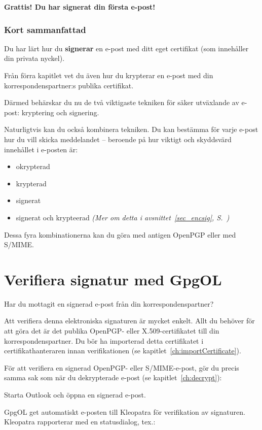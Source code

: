 \documentclass[a4paper,11pt, oneside,openright,titlepage,dvips]{scrbook}
\newcounter{part}
\newcounter{chapter}
\newcounter{section}[chapter]
\begin{document}
\textbf{Grattis! Du har signerat din första e-post!}


\clearpage
\subsubsection{Kort sammanfattad}
Du har lärt hur du \textbf{signerar} en e-post med ditt eget certifikat
(som innehåller din privata nyckel).

Från förra kapitlet vet du även hur du krypterar en e-post
med din korrespondenspartner:s publika certifikat.

Därmed behärskar du nu de två viktigaste tekniken för säker
utväxlande av e-post: kryptering och signering.

Naturligtvis kan du också kombinera tekniken. Du kan bestämma för
varje e-post hur du vill skicka meddelandet -- beroende på hur
viktigt och skyddsvärd innehållet i e-posten är:

\begin{itemize}
    \item okrypterad
    \item krypterad
    \item signerat
    \item signerat och krypteerad \textit{(Mer om detta i
        avsnittet~\ref{sec_encsig}, S.~\pageref{sec_encsig})}
\end{itemize}

Dessa fyra kombinationerna kan du göra med antigen OpenPGP eller
med S/MIME.


\clearpage
\section{Verifiera signatur med GpgOL}
Har du mottagit en signerad e-post från din
korrespondenspartner?

Att verifiera denna elektroniska signaturen är mycket enkelt.
Allt du behöver för att göra det är det publika OpenPGP- eller
X.509-certifikatet till din korrespondenspartner.
Du bör ha importerad detta certifikatet i certifikathanteraren
innan verifikationen (se kapitlet~\ref{ch:importCertificate}).

För att verifiera en signerad OpenPGP- eller S/MIME-e-post,
gör du precis samma sak som när du dekrypterade e-post
(se kapitlet~\ref{ch:decrypt}):

Starta Outlook och öppna en signerad e-post.

GpgOL get automatiskt e-posten till Kleopatra för verifikation
av signaturen. Kleopatra rapporterar med en statusdialog, tex.:
\end{document}
